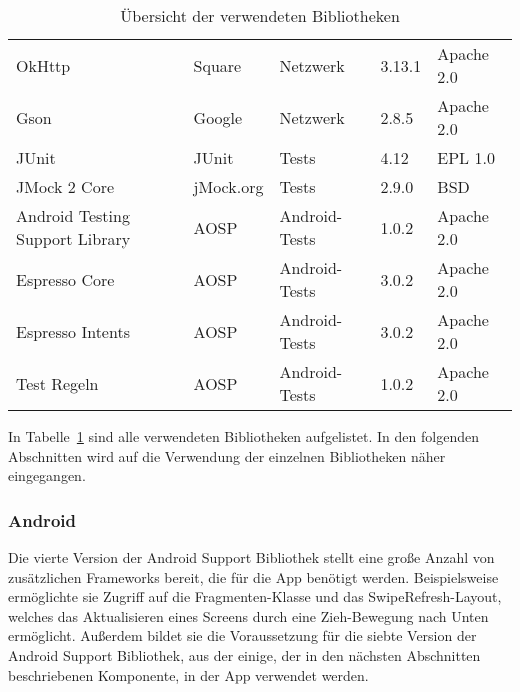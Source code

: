 \begin{table}[h]
\begin{tabularx}{\textwidth}{|X|l|l|l|l|}
        OkHttp & Square & Netzwerk & 3.13.1 & Apache 2.0\\   %
        Gson & Google & Netzwerk & 2.8.5 & Apache 2.0\\   %
        \hline

        JUnit & JUnit & Tests & 4.12 & EPL 1.0\\   %
        JMock 2 Core & jMock.org & Tests & 2.9.0 & BSD\\    %
        \hline

        Android Testing Support Library & AOSP & Android-Tests & 1.0.2 & Apache 2.0\\   %
        Espresso Core & AOSP & Android-Tests & 3.0.2 & Apache 2.0\\    %
        Espresso Intents & AOSP & Android-Tests & 3.0.2 & Apache 2.0\\ %
        Test Regeln & AOSP & Android-Tests & 1.0.2 & Apache 2.0\\  %
        \hline
    \end{tabularx}

    \caption{Übersicht der verwendeten Bibliotheken}
    \label{tab:libraries}
\end{table}

In Tabelle~\ref{tab:libraries} sind alle verwendeten Bibliotheken aufgelistet.
In den folgenden Abschnitten wird auf die Verwendung der einzelnen Bibliotheken näher eingegangen.

\subsubsection{Android} \label{subsubsec:android-libraries}
Die vierte Version der Android Support Bibliothek stellt eine große Anzahl von zusätzlichen Frameworks bereit, die für die App benötigt werden.
Beispielsweise ermöglichte sie Zugriff auf die Fragmenten-Klasse und das SwipeRefresh-Layout, welches das Aktualisieren eines Screens durch eine Zieh-Bewegung nach Unten ermöglicht.
Außerdem bildet sie die Voraussetzung für die siebte Version der Android Support Bibliothek, aus der einige, der in den nächsten Abschnitten beschriebenen Komponente, in der App verwendet werden.

